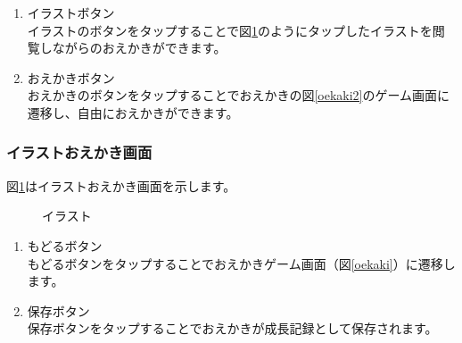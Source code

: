\documentclass[a4j]{jarticle}
\begin{document}
\begin{enumerate}
  \renewcommand{\labelenumi}{\textcircled{\scriptsize \theenumi}}
\item イラストボタン\\
  イラストのボタンをタップすることで図\ref{illustration}のようにタップしたイラストを閲覧しながらのおえかきができます。
\item おえかきボタン\\
  おえかきのボタンをタップすることでおえかきの図\ref{oekaki2}のゲーム画面に遷移し、自由におえかきができます。
\end{enumerate}

\newpage
\subsubsection{イラストおえかき画面}
図\ref{illustration}はイラストおえかき画面を示します。\\

\begin{figure}[H]
    \begin{center}
    \caption {イラスト}
    \label{illustration}
    \end{center}
\end{figure}

\begin{enumerate}
  \renewcommand{\labelenumi}{\textcircled{\scriptsize \theenumi}}
\item もどるボタン\\
  もどるボタンをタップすることでおえかきゲーム画面（図\ref{oekaki}）に遷移します。
\item 保存ボタン\\
  保存ボタンをタップすることでおえかきが成長記録として保存されます。
\end{enumerate}
\end{document}
